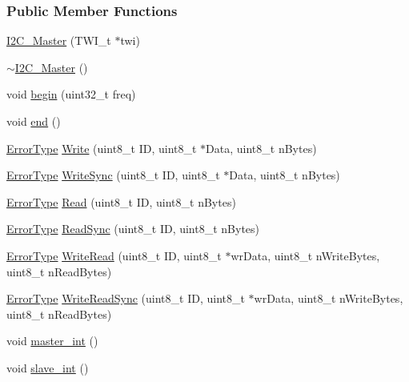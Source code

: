 \subsubsection*{Public Member Functions}
\begin{DoxyCompactItemize}
\item 
\hyperlink{class_i2_c___master_a6d45344a3c34e58da098283992adcab8}{I2C\_\-Master} (TWI\_\-t $\ast$twi)
\item 
\hyperlink{class_i2_c___master_aa02eab973159049903e056283c5fba90}{$\sim$I2C\_\-Master} ()
\item 
void \hyperlink{class_i2_c___master_a4e6323d0c9dc60723d850c3783008319}{begin} (uint32\_\-t freq)
\item 
void \hyperlink{class_i2_c___master_a6a2768a5a33d3186d263e1e11468e023}{end} ()
\item 
\hyperlink{class_i2_c___master_abdfca5f4be266d6d15163ea41e216a57}{ErrorType} \hyperlink{class_i2_c___master_a4fbea22a656d98a3daa618f1eb585744}{Write} (uint8\_\-t ID, uint8\_\-t $\ast$Data, uint8\_\-t nBytes)
\item 
\hyperlink{class_i2_c___master_abdfca5f4be266d6d15163ea41e216a57}{ErrorType} \hyperlink{class_i2_c___master_af6f8c139ec849d0b7a443269ccf52bfe}{WriteSync} (uint8\_\-t ID, uint8\_\-t $\ast$Data, uint8\_\-t nBytes)
\item 
\hyperlink{class_i2_c___master_abdfca5f4be266d6d15163ea41e216a57}{ErrorType} \hyperlink{class_i2_c___master_afaa1d68a9229fdd88022b55ea8bb93fb}{Read} (uint8\_\-t ID, uint8\_\-t nBytes)
\item 
\hyperlink{class_i2_c___master_abdfca5f4be266d6d15163ea41e216a57}{ErrorType} \hyperlink{class_i2_c___master_a0619922b14a1b1da76be49e8f8d4759a}{ReadSync} (uint8\_\-t ID, uint8\_\-t nBytes)
\item 
\hyperlink{class_i2_c___master_abdfca5f4be266d6d15163ea41e216a57}{ErrorType} \hyperlink{class_i2_c___master_a2ecf1fbfb50e43fc9270628910f73813}{WriteRead} (uint8\_\-t ID, uint8\_\-t $\ast$wrData, uint8\_\-t nWriteBytes, uint8\_\-t nReadBytes)
\item 
\hyperlink{class_i2_c___master_abdfca5f4be266d6d15163ea41e216a57}{ErrorType} \hyperlink{class_i2_c___master_a38281efa723712f59d609e2362d124ed}{WriteReadSync} (uint8\_\-t ID, uint8\_\-t $\ast$wrData, uint8\_\-t nWriteBytes, uint8\_\-t nReadBytes)
\item 
void \hyperlink{class_i2_c___master_a6ed9c2eb68a0a17e5bf2d44a1f3fe3a8}{master\_\-int} ()
\item 
void \hyperlink{class_i2_c___master_ad651f27948fadda68b817cc309bd347e}{slave\_\-int} ()

\end{DoxyCompactItemize}
